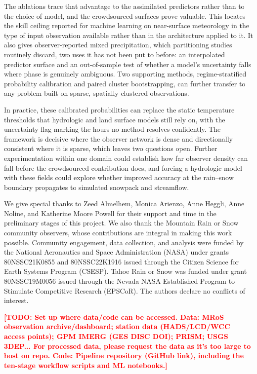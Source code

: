 \documentclass[twocol]{ametsocV6.1} %
\newcommand{\todo}[1]{\textcolor{red}{\textbf{[TODO: #1]}}}
\begin{document}
The ablations trace that advantage to the assimilated predictors rather
than to the choice of model, and the crowdsourced surfaces prove valuable. 
This locates the skill ceiling reported for machine learning
on near-surface meteorology in the type of input observation available rather
than in the architecture applied to it. 
It also gives observer-reported mixed precipitation, which
partitioning studies routinely discard, two uses it has not been put to
before: an interpolated predictor surface and an out-of-sample test of
whether a model's uncertainty falls where phase is genuinely ambiguous.
Two supporting methods, regime-stratified probability calibration and
paired cluster bootstrapping, can further transfer to any problem built on sparse,
spatially clustered observations.

In practice, these calibrated probabilities can replace the static
temperature thresholds that hydrologic and land surface models still
rely on, with the uncertainty flag marking the hours no method resolves
confidently. The framework is decisive where the observer network is
dense and directionally consistent where it is sparse, which leaves two
questions open. Further experimentation within one domain could establish
how far observer density can fall before the crowdsourced contribution
does, and forcing a hydrologic model with these fields could explore
whether improved accuracy at the rain--snow boundary propagates to
simulated snowpack and streamflow.

\acknowledgments
We give special thanks to Zeed Almelhem, Monica Arienzo, Anne Heggli, Anne Noline, and Katherine 
Moore Powell for their support and time in the preliminary stages of this project. 
We also thank the Mountain Rain or Snow community observers, whose
contributions are integral in making this work possible. 
Community engagement, data collection, and analysis were funded by the 
National Aeronautics and Space Administration (NASA) under grants 80NSSC21K0855 
and 80NSSC22K1916 issued through the Citizen Science for Earth Systems Program 
(CSESP). Tahoe Rain or Snow was funded under grant 80NSSC19M0056 issued through 
the Nevada NASA Established Program to Stimulate Competitive Research (EPSCoR). 
The authors declare no conflicts of interest.


\datastatement
\todo{Set up where data/code can be accessed. 
Data: MRoS observation archive/dashboard; station data (HADS/LCD/WCC access points); GPM IMERG (GES DISC DOI); PRISM; USGS
3DEP... For processed data, please request the data as it's too large to host on repo. 
Code: Pipeline repository (GitHub link), including the ten-stage workflow scripts and ML notebooks.}
\end{document}
